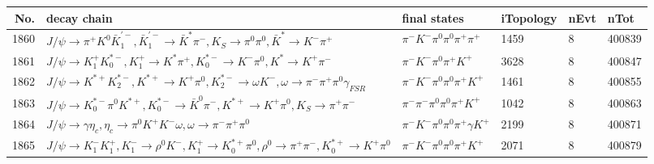 \begin{table}[htbp] 
\begin{center}
\begin{small}
\begin{tabular}{rlllll}\hline\hline
 No. & decay chain & final states &  iTopology & nEvt & nTot \\\hline
1860&$J/\psi       \rightarrow \pi^{+}        K^{0}          \bar{K}_1^{'-}, \bar{K}_1^{'-} \rightarrow \bar{K}^{*}   \pi^{-}        , K_{S}           \rightarrow \pi^{0}        \pi^{0}        , \bar{K}^{*}    \rightarrow K^{-}          \pi^{+}        $&$\pi^{-}        K^{-}          \pi^{0}        \pi^{0}        \pi^{+}        \pi^{+}        $& 1459&    8&400839\\
1861&$J/\psi       \rightarrow K_1^{+}        K_{0}^{*-}     , K_1^{+}         \rightarrow K^{*}          \pi^{+}        , K_{0}^{*-}      \rightarrow K^{-}          \pi^{0}        , K^{*}           \rightarrow K^{+}          \pi^{-}        $&$\pi^{-}        K^{-}          \pi^{0}        \pi^{+}        K^{+}          $& 3628&    8&400847\\
1862&$J/\psi       \rightarrow K^{*+}         K_2^{*-}       , K^{*+}          \rightarrow K^{+}          \pi^{0}        , K_2^{*-}        \rightarrow \omega         K^{-}          , \omega          \rightarrow \pi^{-}        \pi^{+}        \pi^{0}        \gamma_{FSR} $&$\pi^{-}        K^{-}          \pi^{0}        \pi^{0}        \pi^{+}        K^{+}          $& 1461&    8&400855\\
1863&$J/\psi       \rightarrow K_{0}^{*-}     \pi^{0}        K^{*+}         , K_{0}^{*-}      \rightarrow \bar{K}^{0}   \pi^{-}        , K^{*+}          \rightarrow K^{+}          \pi^{0}        , K_{S}           \rightarrow \pi^{+}        \pi^{-}        $&$\pi^{-}        \pi^{-}        \pi^{0}        \pi^{0}        \pi^{+}        K^{+}          $& 1042&    8&400863\\
1864&$J/\psi       \rightarrow \gamma       \eta_{c}    , \eta_{c}     \rightarrow \pi^{0}        K^{+}          K^{-}          \omega         , \omega          \rightarrow \pi^{-}        \pi^{+}        \pi^{0}        $&$\pi^{-}        K^{-}          \pi^{0}        \pi^{0}        \pi^{+}        \gamma       K^{+}          $& 2199&    8&400871\\
1865&$J/\psi       \rightarrow K_{1}^{-}      K_1^{+}        , K_{1}^{-}       \rightarrow \rho^{0}      K^{-}          , K_1^{+}         \rightarrow K_{0}^{*+}     \pi^{0}        , \rho^{0}       \rightarrow \pi^{+}        \pi^{-}        , K_{0}^{*+}      \rightarrow K^{+}          \pi^{0}        $&$\pi^{-}        K^{-}          \pi^{0}        \pi^{0}        \pi^{+}        K^{+}          $& 2071&    8&400879\\

\end{tabular}
\end{small}
\end{center}
\end{table}
